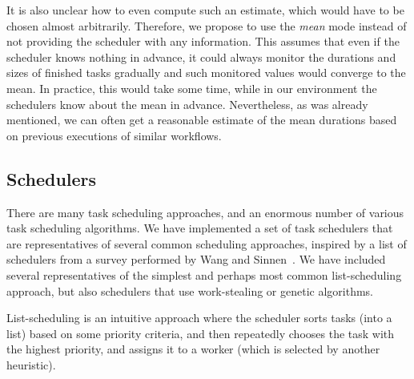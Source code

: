 \begin{description}
		It is also unclear how to even compute such an estimate, which would have to be chosen almost
		arbitrarily. Therefore, we propose to use the \emph{mean} mode instead of not providing
		the scheduler with any information. This assumes that even if the scheduler knows nothing in
		advance, it could always monitor the durations and sizes of finished tasks gradually and such
		monitored values would converge to the mean. In practice, this would take some time, while in our
		environment the schedulers know about the mean in advance. Nevertheless, as was already mentioned,
		we can often get a reasonable estimate of the mean durations based on previous executions of
		similar workflows.
\end{description}

%

\subsection{Schedulers}
\label{subsec:estee-schedulers}
There are many task scheduling approaches, and an enormous number of various task scheduling
algorithms. We have implemented a set of task schedulers that are representatives of several common
scheduling approaches, inspired by a list of schedulers from a survey performed by Wang and
Sinnen~\cite{wang2018list}. We have included several representatives of the simplest and
perhaps most common list-scheduling approach, but also schedulers that use work-stealing or genetic
algorithms.

List-scheduling is an intuitive approach where the scheduler sorts tasks (into a list) based on
some priority criteria, and then repeatedly chooses the task with the highest priority, and assigns
it to a worker (which is selected by another heuristic).

